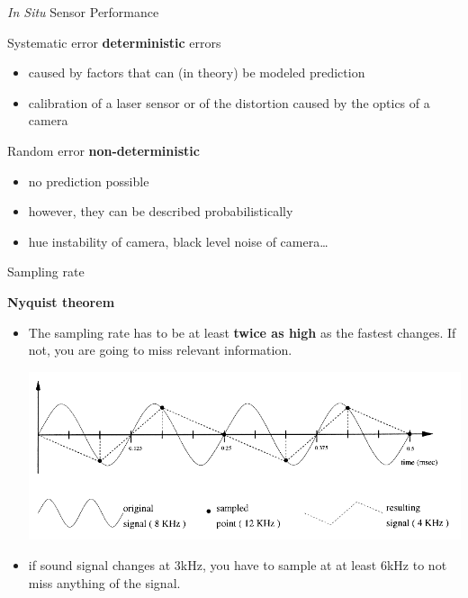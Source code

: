 \documentclass[compress]{beamer}
\begin{document}
\begin{frame}{\emph{In Situ} Sensor Performance}


    Systematic error \Rightarrow \textbf{deterministic} errors

    \begin{itemize}
        \item
              caused by factors that can (in theory) be modeled \rightarrow
              prediction
        \item
              \eg calibration of a laser sensor or of the distortion caused by the
              optics of a camera
    \end{itemize}

    Random error \Rightarrow \textbf{non-deterministic}

    \begin{itemize}

        \item
              no prediction possible
        \item
              however, they can be described probabilistically
        \item
              \eg hue instability of camera, black level noise of camera\ldots
    \end{itemize}

\end{frame}

\begin{frame}{Sampling rate}

    \textbf{Nyquist theorem}

    \begin{itemize}

        \item The sampling rate has to be at least \textbf{twice as high} as the
              fastest changes. If not, you are going to miss relevant information.
              \begin{center}
                  \includegraphics[width=0.8\linewidth]{nyquist}
              \end{center}

        \item \eg if sound signal changes at 3kHz, you have to sample at at least
              6kHz to not miss anything of the signal.
    \end{itemize}

\end{frame}
\end{document}
